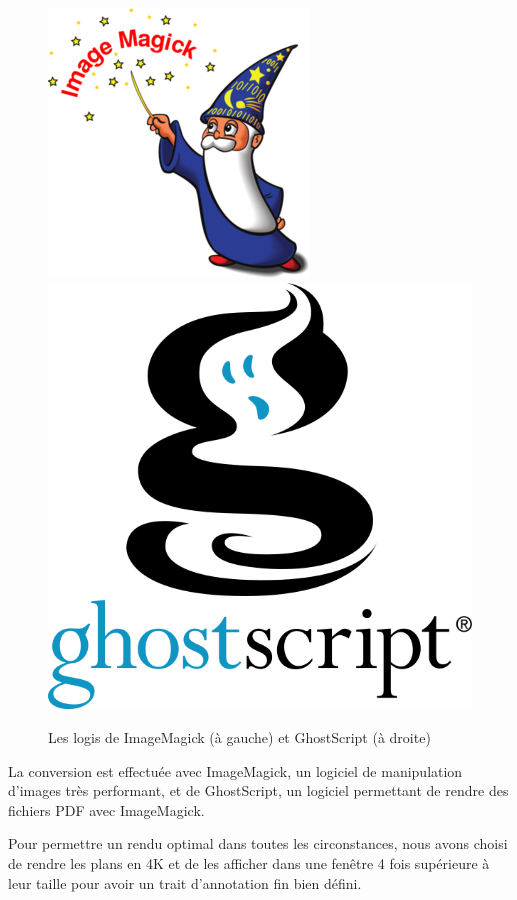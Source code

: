 \begin{figure}[h]
    \centering
    \includegraphics[scale=0.3]{img/image-magick.png}
    \hspace{5cm}
    \includegraphics[scale=0.13]{img/ghostscript.png}
    \caption{Les logis de ImageMagick (à gauche) et GhostScript (à droite)}
\end{figure}

La conversion est effectuée avec ImageMagick, un logiciel de manipulation d'images très performant, et de GhostScript, un logiciel permettant de rendre des fichiers PDF avec ImageMagick.

Pour permettre un rendu optimal dans toutes les circonstances, nous avons choisi de rendre les plans en 4K et de les afficher dans une fenêtre 4 fois supérieure à leur taille pour avoir un trait d'annotation fin bien défini.

